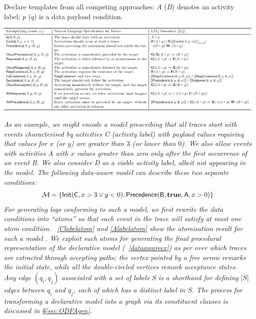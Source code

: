 \documentclass[acmengage]{acmart}
\begin{document}
\begin{table}[!t]
	\centering
\caption{Declare \textsf{templates} from all competing approaches: $A$ ($B$) denotes an activity label; $p$ ($q$) is a data payload condition.}\label{tab:dt}
\includegraphics[scale=1.4]{fig/tabdecl}
\end{table} 

\textit{As an example, we might encode a model prescribing that all traces start with events characterised by activities \textsc{C} (activity label) with payload values requiring that values for $x$ (or $y$) are greater than $3$ (or lower than $0$). We also allow events with activities \textsf{A} with $x$ values greater than zero only after the first occurrence of an event \textsf{B}. We also consider \textsf{D} as a viable activity label, albeit not appearing in the model. The following data-aware model can describe these two separate conditions:}
\begin{equation}\label{eq:moddataaw}
\mathcal{M}=\{\textsf{Init}({\normalfont \textsf{C}},x>3\vee y< 0 ),\textsf{Precedence}({\normalfont \textsf{B}},\textbf
{true}, {\normalfont \textsf{A}},x>0)\}
\end{equation}
\textit{For generating logs conforming to such a model, we first rewrite the data conditions into ``atoms'' so that each event in the trace will satisfy at most one atom condition. \tablename~\ref{Clabelatom} and \ref{Alabelatom} show the atomisation result for  such a model \cite{info14030173}. We exploit such atoms for generating the final procedural representation of the declarative model (\figurename~\ref{dataawareex}) as per \cite{DBLP:conf/bpm/BergamiMMM21} over which traces are extracted through accepting paths; the vertex pointed by a free arrow remarks the initial state, while all the double-circled vertices remark acceptance states. Any edge $(q_i,q_j)$ associated with a set of labels $S$ is a shorthand for defining $|S|$ edges between $q_i$ and $q_j$, each of which has a distinct label in $S$. The process for transforming a declarative model into a graph via its constituent clauses is discussed in \S\ref{sec:ODFAgen}.}
\end{document}
